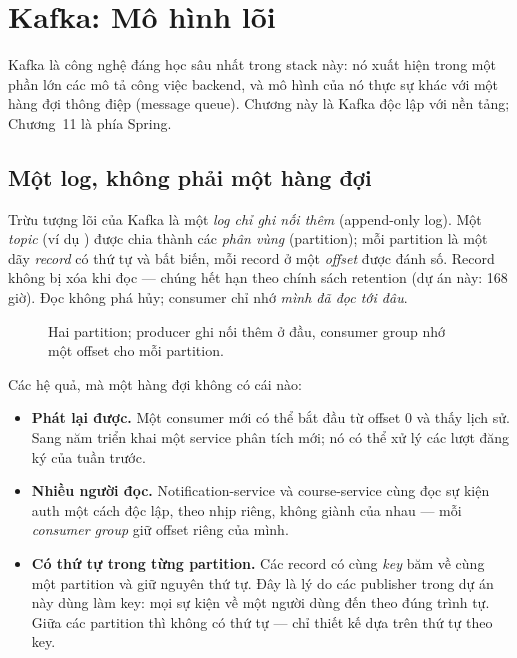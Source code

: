 \chapter{Kafka: Mô hình lõi}
\label{ch:kafkacore}

Kafka là công nghệ đáng học sâu nhất trong stack này: nó xuất hiện trong
một phần lớn các mô tả công việc backend, và mô hình của nó thực sự khác
với một hàng đợi thông điệp (message queue). Chương này là Kafka độc lập
với nền tảng; Chương~11 là phía Spring.

\section{Một log, không phải một hàng đợi}

Trừu tượng lõi của Kafka là một \emph{log chỉ ghi nối thêm} (append-only
log). Một \emph{topic} (ví dụ ) được chia thành
các \emph{phân vùng} (partition); mỗi partition là một dãy \emph{record}
có thứ tự và bất biến, mỗi record ở một \emph{offset} được đánh số.
Record không bị xóa khi đọc --- chúng hết hạn theo chính sách retention
(dự án này: 168 giờ). Đọc không phá hủy; consumer chỉ nhớ \emph{mình đã
đọc tới đâu}.

\begin{figure}[h]
\centering
{}
\caption{Hai partition; producer ghi nối thêm ở đầu, consumer group nhớ
một offset cho mỗi partition.}
\end{figure}

Các hệ quả, mà một hàng đợi không có cái nào:

\begin{itemize}
  \item \textbf{Phát lại được.} Một consumer mới có thể bắt đầu từ offset
  0 và thấy lịch sử. Sang năm triển khai một service phân tích mới; nó
  có thể xử lý các lượt đăng ký của tuần trước.
  \item \textbf{Nhiều người đọc.} Notification-service và course-service
  cùng đọc sự kiện auth một cách độc lập, theo nhịp riêng, không giành
  của nhau --- mỗi \emph{consumer group} giữ offset riêng của mình.
  \item \textbf{Có thứ tự trong từng partition.} Các record có cùng
  \emph{key} băm về cùng một partition và giữ nguyên thứ tự. Đây là lý do
  các publisher trong dự án này dùng  làm key: mọi sự kiện
  về một người dùng đến theo đúng trình tự. Giữa các partition thì không
  có thứ tự --- chỉ thiết kế dựa trên thứ tự theo key.
\end{itemize}

